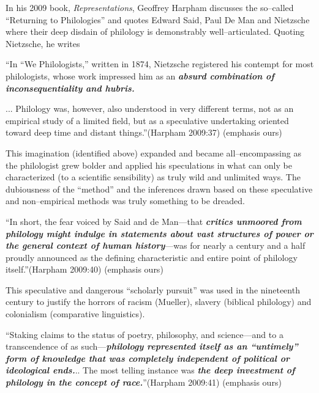 In his 2009 book, \textit{Representations}, Geoffrey Harpham discusses the so–called “Returning to Philologies” and quotes Edward Said, Paul De Man and Nietzsche where their deep disdain of philology is demonstrably well–articulated. Quoting Nietzsche, he writes

“In “We Philologists,” written in 1874, Nietzsche registered his contempt for most philologists, whose work impressed him as an \textbf{\textit{absurd combination of inconsequentiality and hubris.}}

\begin{myquote}
... Philology was, however, also understood in very different terms, not as an empirical study of a limited field, but as a speculative undertaking oriented toward deep time and distant things.”\hfill (Harpham 2009:37) (emphasis ours)
\end{myquote}

This imagination (identified above) expanded and became all–encompassing as the philologist grew bolder and applied his speculations in what can only be characterized (to a scientific sensibility) as truly wild and unlimited ways. The dubiousness of the “method” and the inferences drawn based on these speculative and non–empirical methods was truly something to be dreaded.

\begin{myquote}
“In short, the fear voiced by Said and de Man—that \textbf{\textit{critics unmoored from philology might indulge in statements about vast structures of power or the general context of human history}}—was for nearly a century and a half proudly announced as the defining characteristic and entire point of philology itself.”\hfill (Harpham 2009:40) (emphasis ours)
\end{myquote}

This speculative and dangerous “scholarly pursuit” was used in the nineteenth century to justify the horrors of racism (Mueller), slavery (biblical philology) and colonialism (comparative linguistics).

\begin{myquote}
“Staking claims to the status of poetry, philosophy, and science—and to a transcendence of as such—\textbf{\textit{philology represented itself as an “untimely” form of knowledge that was completely independent of political or ideological ends.}}.. The most telling instance was \textbf{\textit{the deep investment of philology in the concept of race.}}”\hfill (Harpham 2009:41) (emphasis ours)
\end{myquote}

